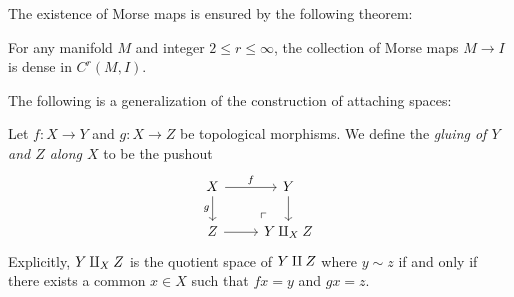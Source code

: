 The existence of Morse maps is ensured by the following theorem:

\begin{theorem}
    \label{thm:morse-maps-are-dense}
    For any manifold \(M\) and integer \(2 \leq r \leq \infty\), the collection of
    Morse maps \(M \to I\) is dense in \(C^r(M, I)\).
\end{theorem}

The following is a generalization of the construction of attaching spaces:

\begin{definition}[Gluing]
    \label{def:gluing-topological-spaces}
    Let \(f: X \to Y\) and \(g: X \to Z\) be topological morphisms. We define the
    \emph{gluing of \(Y\) and \(Z\) along \(X\)} to be the pushout
    \[
        \begin{tikzcd}
            X \ar[d, "g"']
            \ar[r, "f"]
            \ar[rd, "\ulcorner", phantom, very near end]
            &Y \ar[d] \\
            Z \ar[r]
            &Y \disj_X Z
        \end{tikzcd}
    \]
    Explicitly, \(Y \amalg_X Z\) is the quotient space of \(Y \amalg Z\) where
    \(y \sim z\) if and only if there exists a common \(x \in X\) such that
    \(f x = y\) and \(g x = z\).
\end{definition}

